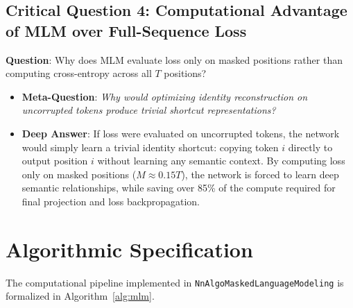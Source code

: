 \documentclass[11pt,a4paper]{article}
\theoremstyle{definition}
\begin{document}
\subsection{\textbf{Critical Question 4: Computational Advantage of MLM over Full-Sequence Loss}}
\textbf{Question}: Why does MLM evaluate loss only on masked positions rather than computing cross-entropy across all $T$ positions?
\begin{itemize}
    \item \textbf{Meta-Question}: \emph{Why would optimizing identity reconstruction on uncorrupted tokens produce trivial shortcut representations?}
    \item \textbf{Deep Answer}: If loss were evaluated on uncorrupted tokens, the network would simply learn a trivial identity shortcut: copying token $i$ directly to output position $i$ without learning any semantic context. By computing loss only on masked positions ($M \approx 0.15 T$), the network is forced to learn deep semantic relationships, while saving over 85\% of the compute required for final projection and loss backpropagation.
\end{itemize}

\section{Algorithmic Specification}

The computational pipeline implemented in \texttt{NnAlgoMaskedLanguageModeling} is formalized in Algorithm~\ref{alg:mlm}.
\end{document}
